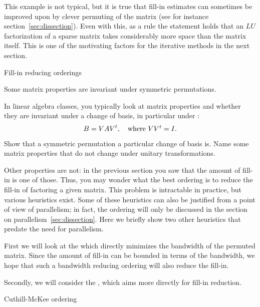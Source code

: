 This example is not typical, but it is true that fill-in
estimates can sometimes be improved upon by clever permuting
of the matrix (see for instance section~\ref{sec:dissection}).
Even with this, as a rule
the statement holds that an $LU$ factorization of a sparse
matrix takes considerably more space than the matrix itself. This is
one of the motivating factors for the iterative methods in the next
section.

 {Fill-in reducing orderings}
\label{sec:fill-ordering}

Some matrix properties are invariant under symmetric permutations.
\begin{exercise}
  In linear algebra classes, you typically look at matrix properties
  and whether they are invariant under a change of basis, in
  particular under :
  \[ B = VAV^t,\quad\hbox{where $VV^t=I$.} \]
  Show that a
  symmetric permutation a particular change of basis is. Name some
  matrix properties that do not change under unitary transformations.
\end{exercise}
Other properties are not: in the previous section you saw that the
amount of fill-in is one of those. Thus, you may wonder what the best
ordering is to reduce the fill-in of factoring a given matrix. This
problem is intractable in practice, but various heuristics exist. Some
of these heuristics can also be justified from a point of view of
parallelism; in fact, the
 ordering will only be discussed in the
section on parallelism~\ref{sec:dissection}.
Here we briefly show two other heuristics that predate the
need for parallelism.

First we will look at the  which
directly minimizes the bandwidth of the permuted matrix.
Since the amount of fill-in can be bounded in terms of the bandwidth,
we hope that such a bandwidth reducing ordering will also reduce the
fill-in.

Secondly, we will consider the ,
which aims more directly for fill-in reduction.

 {Cuthill-McKee ordering}

